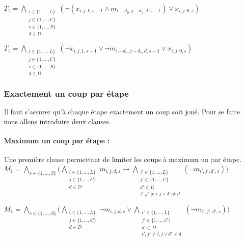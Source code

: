 \documentclass[utf8]{article}
\begin{document}
$T_1 = {\underset{\substack{i\in\{1,...,L\} \\ j\in\{1,...,C\} \\ s\in \{1,...,S\}\\ d \in D}}{\bigwedge}}(\neg(x_{i,j,1,s-1} \wedge m_{i-d_0,j-d_1,d,s-1})\vee x_{i,j,0,s})$\newline

$T_1 = {\underset{\substack{i\in\{1,...,L\} \\ j\in\{1,...,C\} \\ s\in \{1,...,S\}\\ d \in D}}{\bigwedge}}(\neg x_{i,j,1,s-1} \vee \neg m_{i-d_0,j-d_1,d,s-1}\vee x_{i,j,0,s})$\newline

\subsubsection{Exactement un coup par étape}
Il faut s'assurer qu'à chaque étape exactement un coup soit joué. Pour se faire nous allons introduire deux clauses.

\paragraph{Maximum un coup par étape :} 
Une première clause permettant de limiter les coups à maximum un par étape.\newline
\newline
$M_1 = {{\underset{s \in \{1,...,S\}}{\bigwedge}}({\underset{\substack{i\in\{1,...,L\} \\ j\in\{1,...,C\} \\ d \in D}}{\bigwedge}}m_{i,j,d,s} \rightarrow {\underset{\substack{i'\in\{1,...,L\} \\ j'\in\{1,...,C\} \\ d' \in D \\ i',j' \neq i,j \vee d' \neq d}}{\bigwedge}}} (\neg m_{i',j',d',s}))$\newline

$M_1 = {{\underset{s \in \{1,...,S\}}{\bigwedge}}({\underset{\substack{i\in\{1,...,L\} \\ j\in\{1,...,C\} \\ d \in D}}{\bigwedge}}\neg m_{i,j,d,s} \vee {\underset{\substack{i'\in\{1,...,L\} \\ j'\in\{1,...,C\} \\ d' \in D \\ i',j' \neq i,j \vee d' \neq d}}{\bigwedge}}} (\neg m_{i',j',d',s}))$\newline
\end{document}

